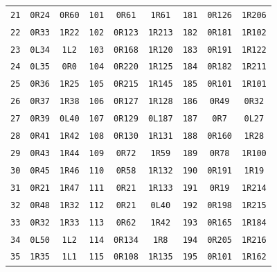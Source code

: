 \begin{longtable}{@{}rcc@{\hspace{1.6em}}rcc@{\hspace{1.6em}}rcc@{}}
\texttt{21} & \texttt{0R24} & \texttt{0R60} & \texttt{101} & \texttt{0R61} & \texttt{1R61} & \texttt{181} & \texttt{0R126} & \texttt{1R206}\\
\texttt{22} & \texttt{0R33} & \texttt{1R22} & \texttt{102} & \texttt{0R123} & \texttt{1R213} & \texttt{182} & \texttt{0R181} & \texttt{1R102}\\
\texttt{23} & \texttt{0L34} & \texttt{1L2} & \texttt{103} & \texttt{0R168} & \texttt{1R120} & \texttt{183} & \texttt{0R191} & \texttt{1R122}\\
\texttt{24} & \texttt{0L35} & \texttt{0R0} & \texttt{104} & \texttt{0R220} & \texttt{1R125} & \texttt{184} & \texttt{0R182} & \texttt{1R211}\\
\texttt{25} & \texttt{0R36} & \texttt{1R25} & \texttt{105} & \texttt{0R215} & \texttt{1R145} & \texttt{185} & \texttt{0R101} & \texttt{1R101}\\
\texttt{26} & \texttt{0R37} & \texttt{1R38} & \texttt{106} & \texttt{0R127} & \texttt{1R128} & \texttt{186} & \texttt{0R49} & \texttt{0R32}\\
\texttt{27} & \texttt{0R39} & \texttt{0L40} & \texttt{107} & \texttt{0R129} & \texttt{0L187} & \texttt{187} & \texttt{0R7} & \texttt{0L27}\\
\texttt{28} & \texttt{0R41} & \texttt{1R42} & \texttt{108} & \texttt{0R130} & \texttt{1R131} & \texttt{188} & \texttt{0R160} & \texttt{1R28}\\
\texttt{29} & \texttt{0R43} & \texttt{1R44} & \texttt{109} & \texttt{0R72} & \texttt{1R59} & \texttt{189} & \texttt{0R78} & \texttt{1R100}\\
\texttt{30} & \texttt{0R45} & \texttt{1R46} & \texttt{110} & \texttt{0R58} & \texttt{1R132} & \texttt{190} & \texttt{0R191} & \texttt{1R19}\\
\texttt{31} & \texttt{0R21} & \texttt{1R47} & \texttt{111} & \texttt{0R21} & \texttt{1R133} & \texttt{191} & \texttt{0R19} & \texttt{1R214}\\
\texttt{32} & \texttt{0R48} & \texttt{1R32} & \texttt{112} & \texttt{0R21} & \texttt{0L40} & \texttt{192} & \texttt{0R198} & \texttt{1R215}\\
\texttt{33} & \texttt{0R32} & \texttt{1R33} & \texttt{113} & \texttt{0R62} & \texttt{1R42} & \texttt{193} & \texttt{0R165} & \texttt{1R184}\\
\texttt{34} & \texttt{0L50} & \texttt{1L2} & \texttt{114} & \texttt{0R134} & \texttt{1R8} & \texttt{194} & \texttt{0R205} & \texttt{1R216}\\
\texttt{35} & \texttt{1R35} & \texttt{1L1} & \texttt{115} & \texttt{0R108} & \texttt{1R135} & \texttt{195} & \texttt{0R101} & \texttt{1R162}\\

\end{longtable}
